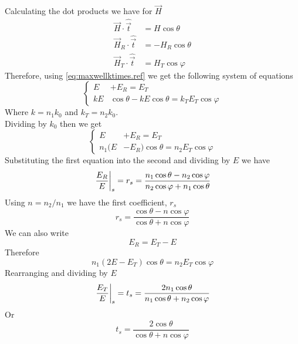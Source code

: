 \documentclass[../electromagnetism.tex]{subfiles}
\begin{document}
Calculating the dot products we have for $\vec{H}$
\begin{equation*}
	\begin{aligned}
		\vec{H}\cdot\hat{\vec{t}}&= H\cos\theta\\
		\vec{H}_R\cdot\hat{\vec{t}}&= -H_R\cos\theta\\
		\vec{H}_T\cdot\hat{\vec{t}}&= H_T\cos\varphi
	\end{aligned}
\end{equation*}
Therefore, using \eqref{eq:maxwellktimes.ref} we get the following system of equations
\begin{equation}
	\left\{ \begin{aligned}
		E&+E_R= E_T\\
		kE&\cos\theta-kE\cos\theta= k_TE_T\cos\varphi
	\end{aligned}\right.
	\label{eq:s-system.ref}
\end{equation}
Where $k=n_1k_0$ and $k_T=n_2k_0$.\\
Dividing by $k_0$ then we get
\begin{equation*}
	\left\{\begin{aligned}
		E&+E_R= E_T\\
		n_1(E&-E_R)\cos\theta= n_2E_T\cos\varphi
	\end{aligned}\right.
\end{equation*}
Substituting the first equation into the second and dividing by $E$ we have
\begin{equation*}
	\eval{\frac{E_R}{E}}_s=r_s=\frac{n_1\cos\theta-n_2\cos\varphi}{n_2\cos\varphi+n_1\cos\theta}
\end{equation*}
Using $n=n_2/n_1$ we have the first coefficient, $r_s$
\begin{equation}
	r_s=\frac{\cos\theta-n\cos\varphi}{\cos\theta+n\cos\varphi}
	\label{eq:r_s1.ref}
\end{equation}
We can also write
\begin{equation*}
	E_R=E_T-E
\end{equation*}
Therefore
\begin{equation*}
	n_1(2E-E_T)\cos\theta=n_2E_T\cos\varphi
\end{equation*}
Rearranging and dividing by $E$
\begin{equation*}
	\eval{\frac{E_T}{E}}_s=t_s=\frac{2n_1\cos\theta}{n_1\cos\theta+n_2\cos\varphi}
\end{equation*}
Or
\begin{equation}
	t_s=\frac{2\cos\theta}{\cos\theta+n\cos\varphi}
	\label{eq:t_s1.ref}
\end{equation}
\end{document}
